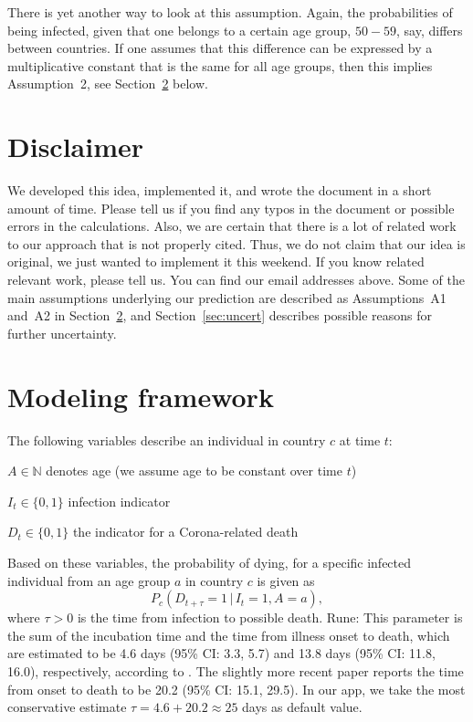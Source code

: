 \documentclass[a4paper]{article}
\newcommand\N{\mathbb{N}}
\newcommand{\given}{\, \vert \,}
\newcommand\Rune[1]{{\color{blue}Rune: #1}}
\begin{document}
There is yet another way to look at this assumption.
Again, the probabilities of 
being infected, given that one belongs to a certain age group, $50-59$, say, differs between countries. If one assumes
that this difference can be expressed by a multiplicative constant that is the same for all age groups, then 
this implies Assumption~2, see Section~\ref{sec:model} below.




\section{Disclaimer} \label{sec:disclaimer}

We 
developed this idea, implemented it, and 
wrote the 
document in a short amount of time. Please tell us if you find any typos 
in the document or possible errors in 
the calculations. 
Also, we are certain that there is a lot of 
related work to our approach that is not properly cited. 
Thus, we do not claim that our idea is original, we just wanted
to implement it this weekend.
If you know related relevant work, please tell us.
You can find our email addresses above.
Some of the main assumptions underlying our prediction are described 
as Assumptions~A1 and~A2 in Section~\ref{sec:model}, and
Section~\ref{sec:uncert} describes possible reasons for further uncertainty.


\section{Modeling framework} \label{sec:model}
The following variables describe an individual in country $c$ at time $t$:
\begin{compactitem}
\item $A \in \N$ denotes age (we assume age to be constant over time $t$)
\item $I_t \in \{0,1\}$ infection indicator
\item $D_t \in \{0,1\}$ the indicator for a Corona-related death
\end{compactitem}
Based on these variables, the probability of dying, for a specific
infected individual from an age group $a$ in country $c$ is given as
\begin{equation*}
  P_c(D_{t+\tau} = 1 \given I_t = 1, A = a), 
\end{equation*}
where $\tau > 0$ is the time from infection to possible
death. \Rune{This parameter is the sum of the incubation time and the time 
from illness onset to death, which are estimated to be 4.6 days (95\% CI: 3.3, 5.7) 
and 13.8 days (95\% CI: 11.8, 16.0), respectively, according to \cite{linton2020epidemiological}. 
The slightly more recent paper \citet{jung2020real} reports the time from onset to death 
to be 20.2 (95\% CI: 15.1, 29.5). In our app, we take the most conservative estimate 
$\tau = 4.6 + 20.2 \approx 25$ days as default value.}
\end{document}
